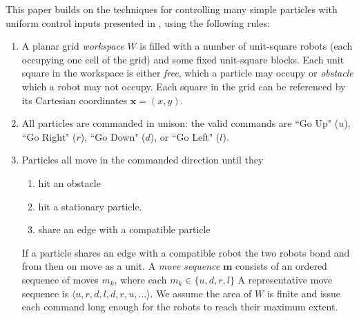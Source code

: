 This paper builds on the techniques for controlling many simple particles with uniform control inputs presented in \cite{Becker2013f,Becker2014,Becker2014a}, using the following rules:
\begin{enumerate}
\item A planar  grid \emph{workspace} $W$ is filled with a number of unit-square robots (each occupying one cell of the grid)  and some fixed unit-square blocks.  Each unit square in the workspace is either  \emph{free}, which a particle may occupy or \emph{obstacle} which a robot may not occupy.  Each square in the grid can be referenced by its Cartesian coordinates $\bm{x}=(x,y)$.
\item All particles are commanded in unison: the valid commands are  ``Go Up" ($u$), ``Go Right" ($r$), ``Go Down" ($d$), or ``Go Left" ($l$).  
\item Particles all move in the commanded direction until they 
	\begin{enumerate}
		\item hit an obstacle 
		\item hit a stationary particle. 
		\item share an edge with a compatible particle
	\end{enumerate}
	If a particle shares an edge with a compatible robot the two robots bond and from then on move as a unit.
A \emph{move sequence} $\bm{m}$ consists of an ordered sequence of moves $m_k$, where each $m_k\in\{u,d,r,l\}$  A representative move sequence is $\langle u,r,d,l,d,r,u,\ldots\rangle$. We assume the area of $W$ is finite and issue each command long enough for the robots to reach their maximum extent.
\end{enumerate}
